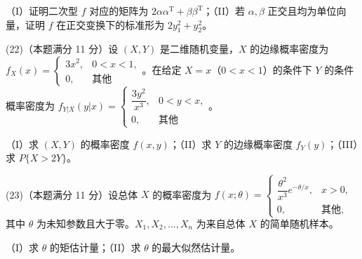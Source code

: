 \documentclass[UTF8,12pt]{ctexart}
\begin{document}
（I）证明二次型 \(\displaystyle f\) 对应的矩阵为 \(\displaystyle 2\alpha\alpha^{\mathrm T}+\beta\beta^{\mathrm T}\)；（II）若 \(\displaystyle \alpha,\allowbreak \beta\) 正交且均为单位向量，证明 \(\displaystyle f\) 在正交变换下的标准形为 \(\displaystyle 2y_1^2+y_2^2\)。


(22)（本题满分 11 分）设 \(\displaystyle (X,\allowbreak Y)\) 是二维随机变量，\(\displaystyle X\) 的边缘概率密度为 \(\displaystyle f_X(x)=\begin{cases}3x^2,\allowbreak &0<x<1,\allowbreak \\0,\allowbreak &\text{其他}\end{cases}\)。在给定 \(\displaystyle X=x\)（\(\displaystyle 0<x<1\)）的条件下 \(\displaystyle Y\) 的条件概率密度为 \(\displaystyle f_{Y|X}(y|x)=\begin{cases}\dfrac{\displaystyle 3y^2}{\displaystyle x^3},\allowbreak &0<y<x,\allowbreak \\0,\allowbreak &\text{其他}\end{cases}\)。


（I）求 \(\displaystyle (X,\allowbreak Y)\) 的概率密度 \(\displaystyle f(x,\allowbreak y)\)；（II）求 \(\displaystyle Y\) 的边缘概率密度 \(\displaystyle f_Y(y)\)；（III）求 \(\displaystyle P\{X>2Y\}\)。


(23)（本题满分 11 分）设总体 \(\displaystyle X\) 的概率密度为 \(\displaystyle f(x;\theta)=\begin{cases}\dfrac{\displaystyle \theta^2}{\displaystyle x^3}e^{-\theta/x},\allowbreak &x>0,\allowbreak \\0,\allowbreak &\text{其他},\allowbreak \end{cases}\) 其中 \(\displaystyle \theta\) 为未知参数且大于零。\(\displaystyle X_1,\allowbreak X_2,\allowbreak \ldots,\allowbreak X_n\) 为来自总体 \(\displaystyle X\) 的简单随机样本。


（I）求 \(\displaystyle \theta\) 的矩估计量；（II）求 \(\displaystyle \theta\) 的最大似然估计量。


\clearpage
\end{document}
